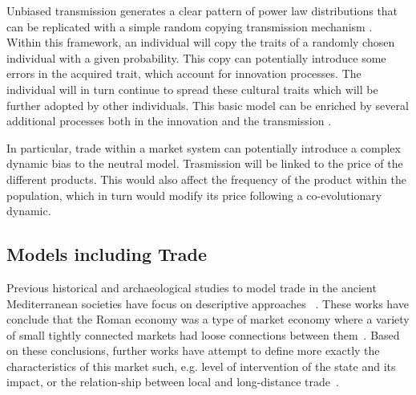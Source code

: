\documentclass{wscpaperproc}
\begin{document}
Unbiased transmission generates a clear pattern of power law distributions that can be replicated with a simple random copying transmission mechanism \cite{bentley_random_2004}. Within this framework, an individual will copy the traits of a randomly chosen individual with a given probability. This copy can potentially introduce some errors in the acquired trait, which account for innovation processes. The individual will in turn continue to spread these cultural traits which will be further adopted by other individuals. This basic model can be enriched by several additional processes both in the innovation \cite{schillinger_copying_2014,sole_evolutionary_2013,ziman_technological_2003} and the transmission \cite{heyes_social_1994,henrich_evolution_2003}.

In particular, trade within a market system can potentially introduce a complex dynamic bias to the neutral model. Trasmission will be linked to the price of the different products. This would also affect the frequency of the product within the population, which in turn would modify its price following a co-evolutionary dynamic.

\subsection{Models including Trade}


Previous historical and archaeological studies to model trade in the ancient Mediterranean societies have focus on descriptive approaches ~\cite{hopkins_taxes_1980,temin_market_2001,terpstra_trade_2011,temin_economy_2006,wilson_approaches_2009,scheidel_model_2007,kessler_organization_2007}. 
These works have conclude that the Roman economy was a type of market economy where a variety of small tightly connected markets had loose connections between them~\cite{temin_market_2001,temin_economy_2006}. 
Based on these conclusions, further works have attempt to define more exactly the characteristics of this market such, e.g. level of intervention of the state and its impact, or the relation-ship between local and long-distance trade~\cite{wilson_approaches_2009}.
\end{document}
